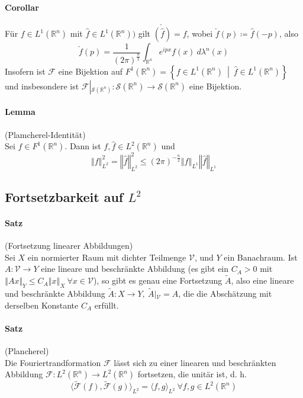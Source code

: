 \documentclass[12pt,a4paper,fleqn]{article}
\def\norm#1{{\left\Vert #1 \right\Vert}}
\def\set#1{{\left\{ #1 \right\}}}
\def\Mid{\ \middle|\ }
\def\R{{\mathbb{R}}}
\begin{document}
\paragraph{Corollar}  Für $f \in L^1(\R^n)$ mit $\widehat{f} \in L^1(\R^n))$ gilt $\check{(\widehat{f})} = f$, wobei $\check{f}(p) \coloneqq \widehat{f}(-p)$, also 
\begin{displaymath}
\check{f}(p) = \frac{1}{(2\pi)^{\frac{n}{2}}} \int_{\R^n} e^{ipx}f(x)\ d\lambda^n(x)
\end{displaymath}
Insofern ist $\mathscr{F}$ eine Bijektion auf $F^1(\R^n) = \set{f \in L^1(\R^n) \Mid \widehat{f} \in L^1(\R^n)}$ und insbesondere ist $\mathscr{F}\left\vert_{\mathscr{S}(\R^n)}\right. \colon \mathscr{S}(\R^n) \rightarrow \mathscr{S}(\R^n)$ eine Bijektion.

\paragraph{Lemma} (Plamcherel-Identität)\\
Sei $f \in F^1(\R^n)$. Dann ist $f, \widehat{f} \in L^2(\R^n)$ und 
\begin{displaymath}
\norm{f}^2_{L^2} = \norm{\widehat{f}}^2_{L^2} \leq (2\pi)^{-\frac{n}{2}} \norm{f}_{L^1} \norm{\widehat{f}}_{L^1}
\end{displaymath}

\subsection{Fortsetzbarkeit auf $L^2$}

\paragraph{Satz} (Fortsetzung linearer Abbildungen)\\
Sei $X$ ein normierter Raum mit dichter Teilmenge $\mathscr{V}$, und $Y$ ein Banachraum.
Ist $A\colon \mathscr{V} \rightarrow Y$ eine lineare und beschränkte Abbildung (es gibt ein $C_A > 0$ mit $\norm{Ax}_Y \leq C_A \norm{x}_X\ \forall x \in \mathscr{V}$), so gibt es genau eine Fortsetzung $\widetilde{A}$, also eine lineare und beschränkte Abbildung $\widetilde{A}\colon X \rightarrow Y,\ \widetilde{A}\left\vert_{\mathscr{V}}\right. = A$, die die Abschätzung mit derselben Konstante $C_A$ erfüllt.

\paragraph{Satz} (Plancherel)\\
Die Fouriertrandformation $\mathscr{F}$ lässt sich zu einer linearen und beschränkten Abbildung $\mathscr{F} \colon L^2(\R^n) \rightarrow L^2(\R^n)$ fortsetzen, die unitär ist, d. h.
\begin{displaymath}
\langle\widetilde{\mathscr{F}}(f), \widetilde{\mathscr{F}}(g)\rangle_{L^2} = \langle f, g\rangle_{L^2}\ \forall f, g \in L^2(\R^n)
\end{displaymath}
\end{document}
